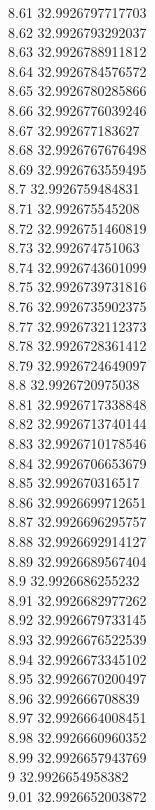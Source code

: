 {8.61	32.9926797717703\\
8.62	32.9926793292037\\
8.63	32.9926788911812\\
8.64	32.9926784576572\\
8.65	32.9926780285866\\
8.66	32.9926776039246\\
8.67	32.992677183627\\
8.68	32.9926767676498\\
8.69	32.9926763559495\\
8.7	32.9926759484831\\
8.71	32.992675545208\\
8.72	32.9926751460819\\
8.73	32.992674751063\\
8.74	32.9926743601099\\
8.75	32.9926739731816\\
8.76	32.9926735902375\\
8.77	32.9926732112373\\
8.78	32.9926728361412\\
8.79	32.9926724649097\\
8.8	32.9926720975038\\
8.81	32.9926717338848\\
8.82	32.9926713740144\\
8.83	32.9926710178546\\
8.84	32.9926706653679\\
8.85	32.992670316517\\
8.86	32.9926699712651\\
8.87	32.9926696295757\\
8.88	32.9926692914127\\
8.89	32.9926689567404\\
8.9	32.9926686255232\\
8.91	32.9926682977262\\
8.92	32.9926679733145\\
8.93	32.9926676522539\\
8.94	32.9926673345102\\
8.95	32.9926670200497\\
8.96	32.992666708839\\
8.97	32.9926664008451\\
8.98	32.9926660960352\\
8.99	32.9926657943769\\
9	32.9926654958382\\
9.01	32.9926652003872\\
}
